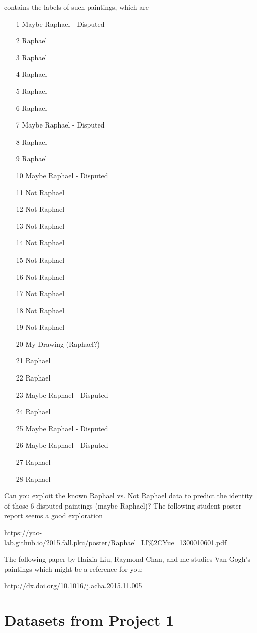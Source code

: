 \documentclass[11pt]{article}
\begin{document}
\noindent contains the labels of such paintings, which are 
\begin{enumerate}
\item[1] Maybe Raphael - Disputed
\item[2] Raphael
\item[3] Raphael
\item[4] Raphael
\item[5] Raphael
\item[6] Raphael
\item[7] Maybe Raphael - Disputed
\item[8] Raphael
\item[9] Raphael
\item[10] Maybe Raphael - Disputed
\item[11] Not Raphael
\item[12] Not Raphael
\item[13] Not Raphael
\item[14] Not Raphael
\item[15] Not Raphael
\item[16] Not Raphael
\item[17] Not Raphael
\item[18] Not Raphael
\item[19] Not Raphael
\item[20] My Drawing (Raphael?)
\item[21] Raphael
\item[22] Raphael
\item[23] Maybe Raphael - Disputed
\item[24] Raphael
\item[25] Maybe Raphael - Disputed
\item[26] Maybe Raphael - Disputed
\item[27] Raphael
\item[28] Raphael
\end{enumerate}
Can you exploit the known Raphael vs. Not Raphael data to predict the identity of those 6 disputed paintings (maybe Raphael)? The following student poster report seems a good exploration

\url{https://yao-lab.github.io/2015.fall.pku/poster/Raphael_LI%2CYue_1300010601.pdf}

The following paper by Haixia Liu, Raymond Chan, and me studies Van Gogh's paintings which might be a reference for you:

\url{http://dx.doi.org/10.1016/j.acha.2015.11.005}


\section*{Datasets from Project 1}
\end{document}
